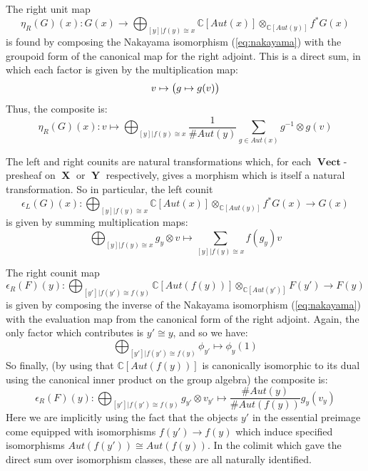 \documentclass[10pt]{amsart}
\numberwithin{theorem}{subsection}
\newcommand{\ra}{\mathop{\rightarrow}}
\newcommand{\opname}[1]{\operatorname{#1}}
\newcommand{\catname}[1]{\boldsymbol{\opname{{#1}}}}
\newcommand{\X}{\catname{X}}
\newcommand{\Y}{\catname{Y}}
\newcommand{\V}{\catname{Vect}}
\begin{document}
The right unit map
\begin{equation}\label{eq:rightunit}
\eta_R(G)(x) : G(x) \ra \bigoplus_{[y] | f(y) \cong x} \mathbb{C}[Aut(x)] \otimes_{\mathbb{C}[Aut(y)]} f^{\ast}G(x)
\end{equation}
is found by composing the Nakayama isomorphism (\ref{eq:nakayama})
with the groupoid form of the canonical map for the right adjoint.
This is a direct sum, in which each factor is given by the
multiplication map:
\begin{equation}
v \mapsto \bigl{(} g \mapsto g(v) \bigr{)}
\end{equation}
Thus, the composite is:
\begin{equation}
\eta_R(G)(x) : v \mapsto \bigoplus_{[y] | f(y) \cong x} \frac{1}{\# Aut(y)}\sum_{g \in Aut(x)} g^{-1} \otimes g(v)
\end{equation}

The left and right counits are natural transformations which, for each
$\V$-presheaf on $\X$ or $\Y$ respectively, gives a morphism which is
itself a natural transformation.  So in particular, the left counit
\begin{equation}\label{eq:leftcounit}
\epsilon_L(G)(x) : \bigoplus_{[y] | f(y) \cong x} \mathbb{C}[Aut(x)] \otimes_{\mathbb{C}[Aut(y)]} f^{\ast} G(x) \ra G(x)
\end{equation}
is given by summing multiplication maps:
\begin{equation}
\bigoplus_{[y] | f(y) \cong x} g_y \otimes v \mapsto \sum_{[y] | f(y) \cong x} f(g_y) v
\end{equation}


The right counit map
\begin{equation}\label{eq:rightcounit}
\epsilon_R(F)(y) : \bigoplus_{[y'] | f(y') \cong f(y)} \mathbb{C}[Aut(f(y))] \otimes_{\mathbb{C}[Aut(y')]} F(y') \ra F(y)
\end{equation}
is given by composing the inverse of the Nakayama isomorphism
(\ref{eq:nakayama}) with the evaluation map from the canonical form of
the right adjoint.  Again, the only factor which contributes is $y'
\cong y$, and so we have:
\begin{equation}
\bigoplus_{[y'] | f(y') \cong f(y)}\phi_{y'} \mapsto \phi_y(1)
\end{equation}
So finally, (by using that $\mathbb{C}[Aut(f(y))]$ is canonically isomorphic to its dual using the canonical inner product on the group algebra) the composite is:
\begin{equation}
\epsilon_R(F)(y) : \bigoplus_{[y'] | f(y') \cong f(y)}g_{y'} \otimes v_{y'} \mapsto \frac{\# Aut(y)}{\# Aut(f(y))} g_y(v_y)
\end{equation}
Here we are implicitly using the fact that the objects $y'$ in the
essential preimage come equipped with isomorphisms $f(y') \ra f(y)$
which induce specified isomorphisms $Aut(f(y')) \cong Aut(f(y))$.  In
the colimit which gave the direct sum over isomorphism classes, these
are all naturally identified.
\end{document}
